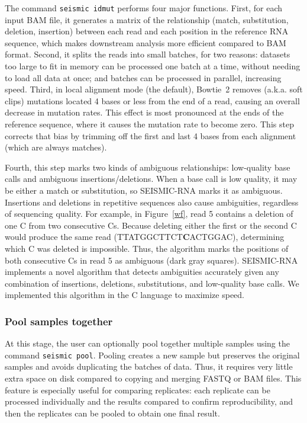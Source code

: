 \documentclass[unnumsec,webpdf,contemporary,large]{oup-authoring-template}%
\theoremstyle{thmstyleone}%
\theoremstyle{thmstyletwo}%
\theoremstyle{thmstylethree}%
\begin{document}
The command \verb|seismic idmut| performs four major functions.
First, for each input BAM file, it generates a matrix of the relationship (match, substitution, deletion, insertion) between each read and each position in the reference RNA sequence, which makes downstream analysis more efficient compared to BAM format.
Second, it splits the reads into small batches, for two reasons: datasets too large to fit in memory can be processed one batch at a time, without needing to load all data at once; and batches can be processed in parallel, increasing speed.
Third, in local alignment mode (the default), Bowtie~2 removes (a.k.a. soft clips) mutations located 4 bases or less from the end of a read, causing an overall decrease in mutation rates.
This effect is most pronounced at the ends of the reference sequence, where it causes the mutation rate to become zero.
This step corrects that bias by trimming off the first and last 4 bases from each alignment (which are always matches).

Fourth, this step marks two kinds of ambiguous relationships: low-quality base calls and ambiguous insertions/deletions.
When a base call is low quality, it may be either a match or substitution, so SEISMIC-RNA marks it as ambiguous.
Insertions and deletions in repetitive sequences also cause ambiguities, regardless of sequencing quality.
For example, in Figure~\ref{wf}, read 5 contains a deletion of one C from two consecutive Cs.
Because deleting either the first or the second C would produce the same read (TTATGGCTTCT\textbf{C}ACTGGAC), determining which C was deleted is impossible.
Thus, the algorithm marks the positions of both consecutive Cs in read 5 as ambiguous (dark gray squares).
SEISMIC-RNA implements a novel algorithm that detects ambiguities accurately given any combination of insertions, deletions, substitutions, and low-quality base calls.
We implemented this algorithm in the C language to maximize speed.

\subsubsection{Pool samples together}

At this stage, the user can optionally pool together multiple samples using the command \verb|seismic pool|.
Pooling creates a new sample but preserves the original samples and avoids duplicating the batches of data.
Thus, it requires very little extra space on disk compared to copying and merging FASTQ or BAM files.
This feature is especially useful for comparing replicates: each replicate can be processed individually and the results compared to confirm reproducibility, and then the replicates can be pooled to obtain one final result.
\end{document}

